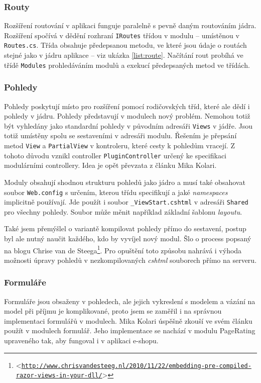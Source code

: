 \documentclass[11pt,twoside,a4paper]{book}
\let\oldUrl\url
\renewcommand\url[1]{<\texttt{\oldUrl{#1}}>}
\begin{document}
\subsubsection{Routy}
Rozšíření routování v aplikaci funguje paralelně s pevně daným routováním jádra. Rozšíření spočívá v dědění rozhraní \texttt{IRoutes} třídou v modulu -- umístěnou v \texttt{Routes.cs}.
Třída obsahuje předepsanou metodu, ve které jsou údaje o routách stejné jako v jádru aplikace -- viz ukázka \ref{list:route}. Načítání rout probíhá ve třídě \texttt{Modules} prohledáváním modulů a exekucí předepsaných metod ve třídách.

\subsubsection{Pohledy}
\label{subsec:pohledy}
Pohledy poskytují místo pro rozšíření pomocí rodičovských tříd, které ale dědí i pohledy v jádru. Pohledy představují v modulech nový problém. Nemohou totiž být vyhledány jako standardní pohledy v původním adresáři \texttt{Views} v jádře. Jsou totiž umístěny spolu se sestaveními v adresáři modulu.
Řešením je přepsání metod \texttt{View} a \texttt{PartialView} v kontroleru, které cesty k pohledům vracejí. Z tohoto důvodu vznikl controller \texttt{PluginController} určený ke specifikaci modulárními controllery. Idea je opět převzata z článku Mika Kolari\cite{kolari}.

Moduly obsahují shodnou strukturu pohledů jako jádro a musí také obsahovat soubor \texttt{Web.config} s určením, kterou třídu specifikují a jaké \textit{namespaces} implicitně používají. Jde použít i soubor
\texttt{\_ViewStart.cshtml} v adresáři \texttt{Shared} pro všechny pohledy. Soubor může měnit například základní šablonu \textit{layoutu}.

Také jsem přemýšlel o variantě kompilovat pohledy přímo do sestavení, postup byl ale nutný naučit každého, kdo by vyvíjel nový modul. Šlo o process popsaný na blogu Chrise van de Steega\footnote{\url{http://www.chrisvandesteeg.nl/2010/11/22/embedding-pre-compiled-razor-views-in-your-dll/}}. Pro opuštění toto způsobu nahrává i výhoda možnosti úpravy pohledů v nezkompilovaných \textit{cshtml} souborech přímo na serveru.

\subsubsection{Formuláře}

Formuláře jsou obsaženy v pohledech, ale jejich vykreslení s modelem a vázání na model při příjmu je komplikované, proto jsem se zaměřil i na správnou implementaci formulářů v modulech. Mika Kolari\cite{kolari} úspěšně zkouší ve svém článku použít v modulech formulář. Jeho implementace se nachází v modulu \textsf{PageRating} upraveného tak, aby fungoval i v aplikaci e-shopu.
\end{document}
